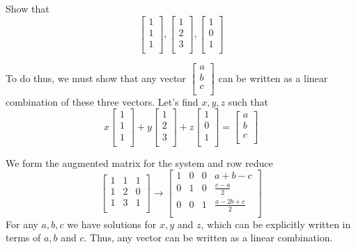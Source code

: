 \documentclass{article}
\begin{document}
\begin{example}
  Show that \[
    \begin{bmatrix}
      1 \\ 1\\ 1\\
    \end{bmatrix},
    \begin{bmatrix}
      1\\2\\3\\
    \end{bmatrix},
    \begin{bmatrix}
      1\\0\\1\\
    \end{bmatrix}
  \]

  To do thus, we must show that any vector $
  \begin{bmatrix}
    a\\b\\c\\
  \end{bmatrix}$ can be written as a linear combination of these three vectors. Let's find $x, y, z$ such that
  \[
    x
    \begin{bmatrix}
      1 \\ 1\\ 1\\
    \end{bmatrix}+
    y
    \begin{bmatrix}
      1\\2\\3\\
    \end{bmatrix}+z
    \begin{bmatrix}
      1\\0\\1\\
    \end{bmatrix} =
    \begin{bmatrix}
      a\\b\\c\\
    \end{bmatrix}
  \]

  We form the augmented matrix for the system and row reduce
  \[
    \begin{bmatrix}
      1 & 1 & 1\\
      1 & 2 & 0\\
      1 & 3 & 1\\
    \end{bmatrix}
    \to
    \begin{bmatrix}
      1 & 0 & 0 & a + b - c\\
      0 & 1 & 0 & \frac{c-a}{2}\\
      0 & 0 & 1 & \frac{a - 2b + c}{2}\\
    \end{bmatrix}
  \]
  For any $a, b, c$ we have solutions for $x, y$ and $z$, which can be explicitly written in terms of $a, b$ and $c$. Thus, any vector can be written as a linear combination.
\end{example}
\end{document}
